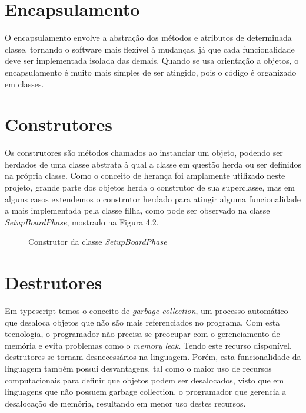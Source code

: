 \documentclass[rel_mlp]{iiufrgs}
\numberwithin{figure}{chapter}
\begin{document}
\section{Encapsulamento}

O encapsulamento envolve a abstração dos métodos e atributos de determinada classe, tornando o software mais flexível à mudanças, já que cada funcionalidade deve ser implementada isolada das demais. Quando se usa orientação a objetos, o encapsulamento é muito mais simples de ser atingido, pois o código é organizado em classes.

\section{Construtores}

Os construtores são métodos chamados ao instanciar um objeto, podendo ser herdados de uma classe abstrata à qual a classe em questão herda ou ser definidos na própria classe. Como o conceito de herança foi amplamente utilizado neste projeto, grande parte dos objetos herda o construtor de sua superclasse, mas em alguns casos extendemos o construtor herdado para atingir alguma funcionalidade a mais implementada pela classe filha, como pode ser observado na classe \textit{SetupBoardPhase}, mostrado na Figura 4.2.

\begin{figure}[ht]
\centering {
	
}
%
%
\caption{Construtor da classe \textit{SetupBoardPhase}}
\label{fig:tsClass}
\end{figure}

 
\section{Destrutores}

Em typescript temos o conceito de \textit{garbage collection}, um processo automático que desaloca objetos que não são mais referenciados no programa. Com esta tecnologia, o programador não precisa se preocupar com o gerenciamento de memória e evita problemas como o \textit{memory leak}. Tendo este recurso disponível, destrutores se tornam desnecessários na linguagem. Porém, esta funcionalidade da linguagem também possui desvantagens, tal como o maior uso de recursos computacionais para definir que objetos podem ser desalocados, visto que em linguagens que não possuem garbage collection, o programador que gerencia a desalocação de memória, resultando em menor uso destes recursos.
\cite{memMng}
\end{document}
